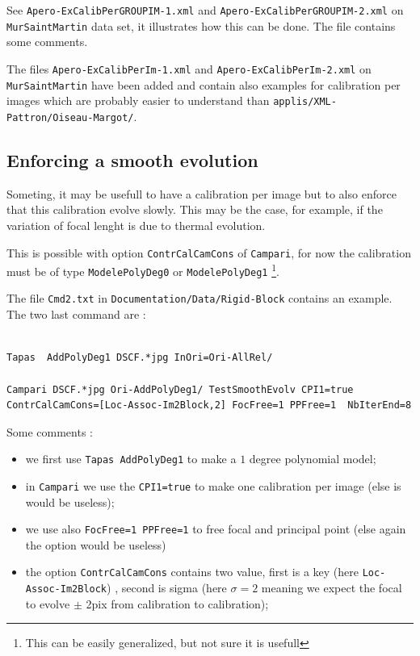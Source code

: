 See {\tt Apero-ExCalibPerGROUPIM-1.xml} and
{\tt Apero-ExCalibPerGROUPIM-2.xml}  on  {\tt MurSaintMartin} data
set, it illustrates how this can be done. The file contains
some comments.


The files {\tt Apero-ExCalibPerIm-1.xml} and {\tt Apero-ExCalibPerIm-2.xml}
on  {\tt MurSaintMartin} have been added and contain also
examples for calibration per images which are probably easier to understand
than {\tt  applis/XML-Pattron/Oiseau-Margot/}.




\subsection{Enforcing a smooth evolution}

Someting, it may be usefull to have a calibration per image but to also
enforce that this calibration evolve slowly. This may be the case,
for example, if the  variation of focal lenght is due to thermal evolution.

This is possible with option {\tt  ContrCalCamCons} of {\tt Campari}, for now
the calibration must be of type {\tt ModelePolyDeg0} or {\tt ModelePolyDeg1}
\footnote{This can be easily generalized, but not sure it is usefull}.

The file {\tt Cmd2.txt} in {\tt Documentation/Data/Rigid-Block} contains an example. The two last command are  :

\begin{verbatim}

Tapas  AddPolyDeg1 DSCF.*jpg InOri=Ori-AllRel/

Campari DSCF.*jpg Ori-AddPolyDeg1/ TestSmoothEvolv CPI1=true ContrCalCamCons=[Loc-Assoc-Im2Block,2] FocFree=1 PPFree=1  NbIterEnd=8
\end{verbatim}

Some comments :

\begin{itemize}
   \item   we first use {\tt Tapas AddPolyDeg1} to make a $1$  degree polynomial model;
   \item   in {\tt Campari} we use the {\tt CPI1=true} to  make one calibration per image (else is would be useless);
   \item    we use also {\tt FocFree=1 PPFree=1} to free focal and principal point (else again the option would be useless)
   \item     the option {\tt ContrCalCamCons} contains two value, first is a key (here {\tt Loc-Assoc-Im2Block})
             , second is sigma (here $\sigma=2$ meaning we expect the focal to evolve $\pm$ 2pix from calibration to calibration);
\end{itemize}

